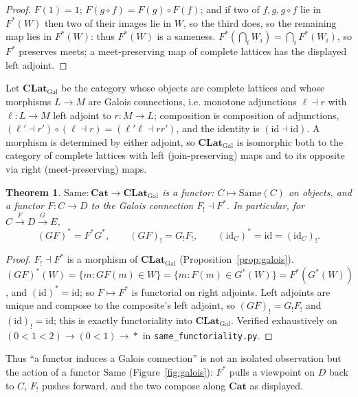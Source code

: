 \documentclass[11pt]{amsart}
\newtheorem{thm}{Theorem}[section]
\theoremstyle{definition}
\newcommand{\Same}{\mathrm{Same}}
\newcommand{\Fstar}{F^{*}}
\newcommand{\Fshriek}{F_{!}}
\newcommand{\Cat}{\mathbf{Cat}}
\newcommand{\CLatGal}{\mathbf{CLat}_{\mathrm{Gal}}}
\begin{document}
\begin{proof}
$F(1)=1$; $F(g\circ f)=F(g)\circ F(f)$; and if two of $f,g,g\circ f$ lie in
$\Fstar(W)$ then two of their images lie in $W$, so the third does, so the
remaining map lies in $\Fstar(W)$: thus $\Fstar(W)$ is a sameness.
$\Fstar(\bigcap_i W_i)=\bigcap_i\Fstar(W_i)$, so $\Fstar$ preserves meets; a
meet-preserving map of complete lattices has the displayed left adjoint.
\end{proof}

Let $\CLatGal$ be the category whose objects are complete lattices and whose
morphisms $L\to M$ are Galois connections, i.e. monotone adjunctions
$\ell\dashv r$ with $\ell\colon L\to M$ left adjoint to $r\colon M\to L$;
composition is composition of adjunctions, $(\ell'\dashv r')\circ(\ell\dashv
r)=(\ell'\ell\dashv rr')$, and the identity is $(\mathrm{id}\dashv\mathrm{id})$.
A morphism is determined by either adjoint, so $\CLatGal$ is isomorphic both to
the category of complete lattices with left (join-preserving) maps and to its
opposite via right (meet-preserving) maps.

\begin{thm}\label{thm:functorial}
$\Same\colon\Cat\to\CLatGal$ is a functor: $C\mapsto\Same(C)$ on objects, and a
functor $F\colon C\to D$ to the Galois connection $\Fshriek\dashv\Fstar$. In
particular, for $C\xrightarrow{F}D\xrightarrow{G}E$,
\[
(GF)^{*}=F^{*}G^{*},\qquad (GF)_{!}=G_{!}F_{!},\qquad
(\mathrm{id}_C)^{*}=\mathrm{id}=(\mathrm{id}_C)_{!}.
\]
\end{thm}

\begin{proof}
$\Fshriek\dashv\Fstar$ is a morphism of $\CLatGal$ (Proposition~\ref{prop:galois}).
$(GF)^{*}(W)=\{m:GF(m)\in W\}=\{m:F(m)\in G^{*}(W)\}=F^{*}(G^{*}(W))$, and
$(\mathrm{id})^{*}=\mathrm{id}$; so $F\mapsto\Fstar$ is functorial on right
adjoints. Left adjoints are unique and compose to the composite's left adjoint,
so $(GF)_{!}=G_{!}F_{!}$ and $(\mathrm{id})_{!}=\mathrm{id}$; this is exactly
functoriality into $\CLatGal$. Verified exhaustively on
$(0<1<2)\xrightarrow{}(0<1)\xrightarrow{}\ast$ in
\texttt{same\_functoriality.py}.
\end{proof}

Thus ``a functor induces a Galois connection'' is not an isolated observation
but the action of a functor $\Same$ (Figure~\ref{fig:galois}): $\Fstar$ pulls a
viewpoint on $D$ back to $C$, $\Fshriek$ pushes forward, and the two compose
along $\Cat$ as displayed.
\end{document}
